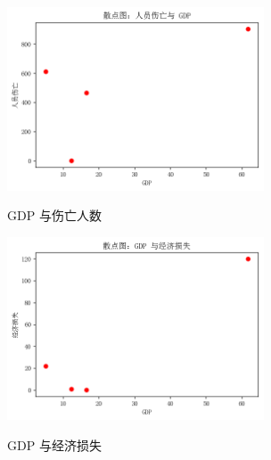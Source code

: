 \documentclass[UTF8]{ctexart}
\begin{document}
\begin{figure}[htbp]
  \begin{minipage}[t]{0.5\linewidth}
    \centering
    \includegraphics[width=3in]{../images/scatter-gdp-person.png}
    \label{fig:scatter:gdp-person}
    \caption{GDP 与伤亡人数}
  \end{minipage}
  \begin{minipage}[t]{0.5\linewidth}
    \centering
    \includegraphics[width=3in]{../images/scatter-gdp-economy.png}
    \label{fig:scatter:gdp-economy}
    \caption{GDP 与经济损失}
\end{minipage}
\end{figure}
\end{document}
